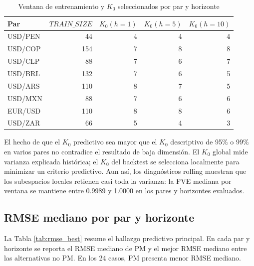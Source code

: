 \documentclass[12pt,a4paper]{article}
\begin{document}
\begin{table}[H]
\centering
\caption{Ventana de entrenamiento y \(K_0\) seleccionados por par y horizonte}
\label{tab:tuning}
\small
\begin{tabular}{lrrrr}
\toprule
Par & \(TRAIN\_SIZE\) & \(K_0(h=1)\) & \(K_0(h=5)\) & \(K_0(h=10)\) \\
\midrule
USD/PEN & 44 & 4 & 4 & 4 \\
USD/COP & 154 & 7 & 8 & 8 \\
USD/CLP & 88 & 7 & 6 & 7 \\
USD/BRL & 132 & 7 & 6 & 5 \\
USD/ARS & 110 & 8 & 7 & 5 \\
USD/MXN & 88 & 7 & 6 & 6 \\
EUR/USD & 110 & 8 & 8 & 6 \\
USD/ZAR & 66 & 5 & 4 & 3 \\
\bottomrule
\end{tabular}
\end{table}

El hecho de que el \(K_0\) predictivo sea mayor que el \(K_0\) descriptivo de 95\% o 99\% en varios pares no contradice el resultado de baja dimensión. El \(K_0\) global mide varianza explicada histórica; el \(K_0\) del backtest se selecciona localmente para minimizar un criterio predictivo. Aun así, los diagnósticos rolling muestran que los subespacios locales retienen casi toda la varianza: la FVE mediana por ventana se mantiene entre 0.9989 y 1.0000 en los pares y horizontes evaluados.

\subsection{RMSE mediano por par y horizonte}

La Tabla \ref{tab:rmse_best} resume el hallazgo predictivo principal. En cada par y horizonte se reporta el RMSE mediano de PM y el mejor RMSE mediano entre las alternativas no PM. En los 24 casos, PM presenta menor RMSE mediano.
\end{document}
